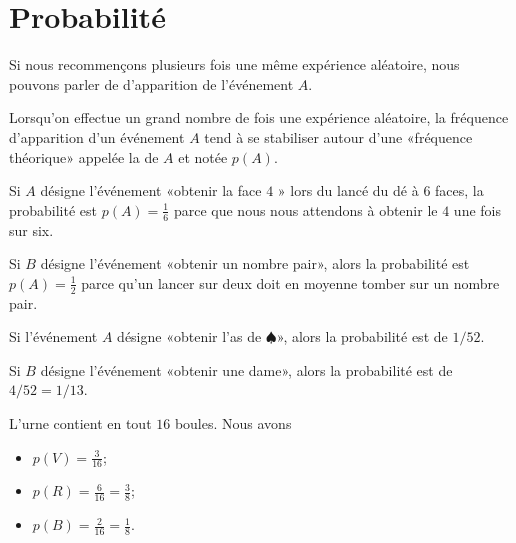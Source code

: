 \section{Probabilité}

Si nous recommençons plusieurs fois une même expérience aléatoire, nous pouvons parler de  d'apparition de l'événement \( A\).

\begin{definition}
    Lorsqu'on effectue un grand nombre de fois une expérience aléatoire, la fréquence d'apparition d'un événement \( A\) tend à se stabiliser autour d'une «fréquence théorique» appelée la  de \( A\) et notée \( p(A)\).
\end{definition}

\begin{example}
    Si \( A\) désigne l'événement «obtenir la face \( 4\) » lors du lancé du dé à \( 6\) faces, la probabilité est \( p(A)=\frac{1}{ 6 }\) parce que nous nous attendons à obtenir le \( 4\) une fois sur six.

    Si \( B\) désigne l'événement «obtenir un nombre pair», alors la probabilité est \( p(A)=\frac{ 1 }{2}\) parce qu'un lancer sur deux doit en moyenne tomber sur un nombre pair.
\end{example}

\begin{example}
    Si l'événement \( A\) désigne «obtenir l'as de $\spadesuit$», alors la probabilité est de \( 1/52\).
    
    Si \( B\) désigne l'événement «obtenir une dame», alors la probabilité est de \( 4/52=1/13\).
\end{example}

\begin{example}
    L'urne contient en tout \( 16\) boules. Nous avons
    \begin{itemize}
        \item \( p(V)=\frac{ 3 }{ 16 }\);
        \item
            \( p(R)=\frac{ 6 }{ 16 }=\frac{ 3 }{ 8 }\);
        \item
            \( p(B)=\frac{ 2 }{ 16 }=\frac{1}{ 8 }\).
    \end{itemize}
    
\end{example}


